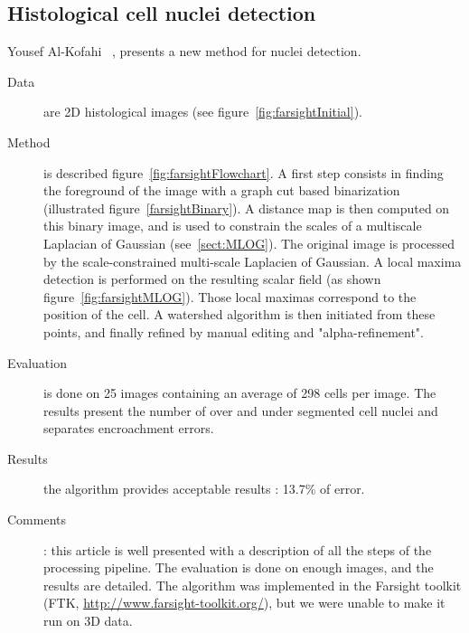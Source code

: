\clearpage

\subsection*{Histological cell nuclei detection}
\label{sect:farsight}
Yousef Al-Kofahi {\etal}~\cite{al2009improved}, presents a new method for nuclei detection.
  \begin{description}
  \item[Data] are 2D histological images (see figure~\ref{fig:farsightInitial}).
  \item[Method] is described figure~\ref{fig:farsightFlowchart}.
  A first step consists in finding the foreground of the image with a graph cut based binarization (illustrated figure~\ref{farsightBinary}).
  A distance map is then computed on this binary image, and is used to constrain the scales of a multiscale Laplacian of Gaussian (see~\ref{sect:MLOG}).
  The original image is processed by the scale-constrained multi-scale Laplacien of Gaussian.
  A local maxima detection is performed on the resulting scalar field (as shown figure~\ref{fig:farsightMLOG}).
  Those local maximas correspond to the position of the cell.
  A watershed algorithm is then initiated from these points, and finally refined by manual editing and "alpha-refinement".
  \item[Evaluation] is done on 25 images containing an average of 298 cells per image. The results present the number of over and under segmented cell nuclei and separates encroachment errors.
  \item[Results] the algorithm provides acceptable results : 13.7\% of error.
  \item[Comments]: this article is well presented with a description of all the steps of the processing pipeline.
  The evaluation is done on enough images, and the results are detailed.
  The algorithm was implemented in the Farsight toolkit (FTK, \url{http://www.farsight-toolkit.org/}), but we were unable to make it run on 3D data.
\end{description}
